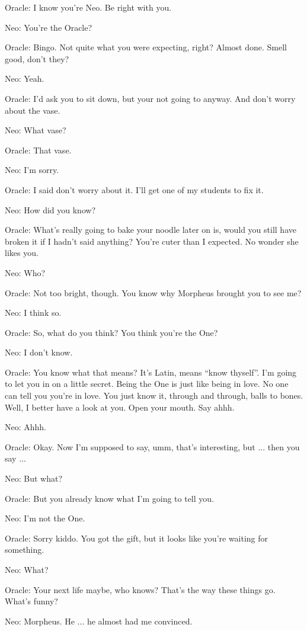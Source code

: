 \documentclass{ctexart}
\newenvironment{myquote}{\color{green} \setlength{\leftskip}{6em} \setlength{\rightskip}{4em} \setlength{\parindent}{-2em}}{\par}
\begin{document}
\begin{myquote}
Oracle: I know you're Neo. Be right with you.

Neo: You're the Oracle?

Oracle: Bingo. Not quite what you were expecting, right? Almost done. Smell good, don't they?

Neo: Yeah.

Oracle: I'd ask you to sit down, but your not going to anyway. And don't worry about the vase.

Neo: What vase?

Oracle: That vase.

Neo: I'm sorry.

Oracle: I said don't worry about it. I'll get one of my students to fix it.

Neo: How did you know?

Oracle: What's really going to bake your noodle later on is, would you still have broken it if I hadn't said anything? You're cuter than I expected. No wonder she likes you.

Neo: Who?

Oracle: Not too bright, though. You know why Morpheus brought you to see me?

Neo: I think so.

Oracle: So, what do you think? You think you're the One?

Neo: I don't know.

Oracle: You know what that means? It's Latin, means ``know thyself''. I'm going to let you in on a little secret. Being the One is just like being in love. No one can tell you you're in love. You just know it, through and through, balls to bones. Well, I better have a look at you. Open your mouth. Say ahhh.

Neo: Ahhh.

Oracle: Okay. Now I'm supposed to say, umm, that's interesting, but ... then you say ...

Neo: But what?

Oracle: But you already know what I'm going to tell you.

Neo: I'm not the One.

Oracle: Sorry kiddo. You got the gift, but it looks like you're waiting for something.

Neo: What?

Oracle: Your next life maybe, who knows? That's the way these things go. What's funny?

Neo: Morpheus. He ... he almost had me convinced.


\end{myquote}
\end{document}
